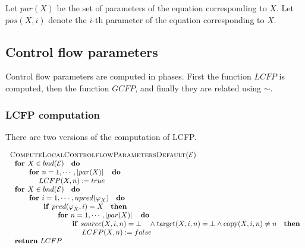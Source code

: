 Let $par(X)$ be the set of parameters of the equation corresponding to $X$.
Let $pos(X,i)$ denote the $i$-th parameter of the equation corresponding to $%
X$.\newpage

\subsection{Control flow parameters}

Control flow parameters are computed in phases. First the function $LCFP$ is
computed, then the function $GCFP$, and finally they are related using $\sim 
$.

\subsubsection{LCFP computation}

There are two versions of the computation of LCFP.

\begin{equation*}
\begin{tabular}{l}
\textsc{ComputeLocalControlflowParametersDefault(}$\mathcal{E}$\textsc{)} \\ 
$\text{\textbf{for }}X\in bnd(\mathcal{E})\text{ \textbf{do}}$ \\ 
$\qquad \text{\textbf{for }}n=1,\cdots ,\left\vert par(X)\right\vert \text{ 
\textbf{do}}$ \\ 
$\qquad \qquad LCFP(X,n):=true$ \\ 
$\text{\textbf{for }}X\in bnd(\mathcal{E})\text{ \textbf{do}}$ \\ 
$\qquad \text{\textbf{for }}i=1,\cdots ,npred(\varphi _{X})\text{ \textbf{do}%
}$ \\ 
$\qquad \qquad \text{\textbf{if }}pred(\varphi _{X},i)=X\text{ \textbf{then}}
$ \\ 
$\qquad \qquad \qquad \text{\textbf{for }}n=1,\cdots ,\left\vert
par(X)\right\vert \text{ \textbf{do}}$ \\ 
$\qquad \qquad \qquad \qquad \text{\textbf{if }}source(X,i,n)=\bot \text{ }%
\wedge \mathrm{target}(X,i,n)=\bot \wedge \mathrm{copy}(X,i,n)\neq n\text{ 
\textbf{then}}$ \\ 
$\qquad \qquad \qquad \qquad \qquad LCFP(X,n):=false$ \\ 
$\text{\textbf{return} }LCFP$%
\end{tabular}%
\end{equation*}

